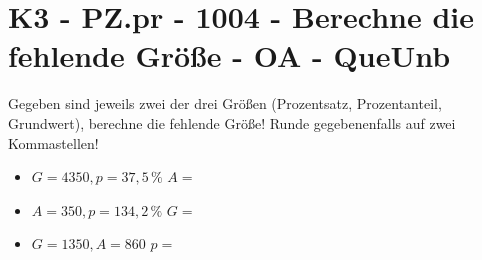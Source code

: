 \section{K3 - PZ.pr - 1004 - Berechne die fehlende Größe - OA - QueUnb}

\begin{beispiel}{0} %
				Gegeben sind jeweils zwei der drei Größen (Prozentsatz, Prozentanteil, Grundwert), berechne die fehlende Größe! Runde gegebenenfalls auf zwei Kommastellen!
				
				\begin{itemize}
					\item $G=4350, p=37,5\,\%$ \hspace{1,5cm}$A=$ \leer
					
					\item $A=350, p=134,2\,\%$ \hspace{1,5cm}$G=$ \leer
					
					\item $G=1350, A=860$ \hspace{2cm}$p=$ 
				\end{itemize}
\end{beispiel}